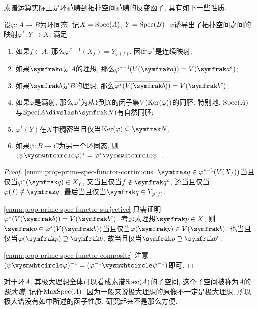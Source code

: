 素谱运算实际上是环范畴到拓扑空间范畴的反变函子, 具有如下一些性质.

\begin{proposition}\label{prop:primespecfunctor}
  设$\varphi\colon A\to B$为环同态, 记$X=\operatorname{Spec} (A)$, $Y=\operatorname{Spec} (B)$. $\varphi$诱导出了拓扑空间之间的映射$\varphi^*\colon Y\to X$, 满足
  \begin{enumerate}
    \item\label{enum:prop-prime-spec-functor-continuous} 如果$f\in A$, 那么$\varphi^{*-1}(X_f)=Y_{\varphi(f)}$. 因此$\varphi^*$是连续映射;
    \item 如果$\ideal{a}$是$A$的理想, 那么$\varphi^{*-1}(V(\ideal{a}))=V(\ideal{a}^e)$;
    \item 如果$\ideal{b}$是$B$的理想, 那么$\overline{\varphi^*(V(\ideal{b}))}=V(\ideal{b}^c)$;
    \item\label{enum:prop-prime-spec-functor-surjective} 如果$\varphi$是满射, 那么$\varphi^*$为从$Y$到$X$的闭子集$V(\operatorname{Ker} (\varphi))$的同胚. 特别地, $\operatorname{Spec} (A)$与$\Spec (A{\divslash}\nil)$有自然同胚;
    \item $\varphi^*(Y)$在$X$中稠密当且仅当$\Ker (\varphi)\subseteq \nil$;
    \item\label{enum:prop-prime-spec-functor-composite} 如果$\psi\colon B\to C$为另一个环同态, 则$(\psi\composite\varphi)^*=\varphi^*\composite\psi^*$.
  \end{enumerate}
\end{proposition}

\begin{proof}
  \ref{enum:prop-prime-spec-functor-continuous} $\ideal{q}\in\varphi^{*-1}(V(X_f))$当且仅当$\varphi^*(\ideal{q})\in X_f$, 又当且仅当$f\notin \ideal{q}^c$, 还当且仅当$\varphi (f)\notin \ideal{q}$, 最后当且仅当$\ideal{q}\in Y_{\varphi (f)}$.

  \ref{enum:prop-prime-spec-functor-surjective} 只需证明$\varphi^*(V(\ideal{b}))=V(\ideal{b}^c)$. 考虑素理想$\ideal{p}\in X$, 则$\ideal{p}\in\varphi^*(V(\ideal{b}))$当且仅当$\varphi(\ideal{p})\in V(\ideal{b})$, 也当且仅当$\varphi(\ideal{p})\supseteq\ideal{b}$, 故当且仅当$\ideal{p}\supseteq\ideal{b}^c$.

  \ref{enum:prop-prime-spec-functor-composite} 注意$(\psi\composite\varphi)^{-1}=(\varphi^{-1}\composite\psi^{-1})$即可.
\end{proof}

对于环$A$, 其极大理想全体可以看成素谱$\operatorname{Spec} (A)$的子空间, 这个子空间被称为$A$的\emph{极大谱}, 记作$\operatorname{MaxSpec} (A)$. 因为一般来说极大理想的原像不一定是极大理想, 所以极大谱没有如中所述的函子性质, 研究起来不是那么方便.

